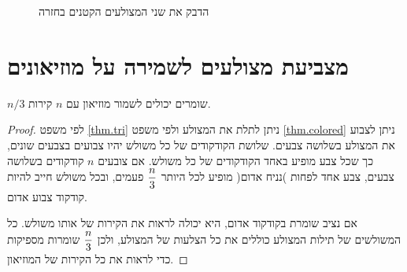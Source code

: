 \begin{figure}[htb]
\begin{center}
\end{center}
\caption{הדבק את שני המצולעים הקטנים בחזרה}\label{f.museum.three-5}
\end{figure}


\section{מצביעת מצולעים לשמירה על מוזיאונים}\label{s.museum-guard}

\begin{theorem}
$n/3$
שומרים יכולים לשמור מוזיאון עם 
$n$
קירות.
\end{theorem}


\begin{proof}
לפי משפט
\ref{thm.tri}
ניתן לתלת את המצולע ולפי משפט
\ref{thm.colored}
ניתן לצבוע את המצולע בשלושה צבעים. שלושת הקודקודים של כל משולש יהיו צבועים בצבעים שונים, כך שכל צבע מופיע באחד הקודקודים של כל משולש. אם צובעים 
$n$
קודקודים בשלושה צבעים, צבע אחד לפחות )נניח אדום( מופיע לכל היותר
$\displaystyle\frac{n}{3}$
פעמים, ובכל משולש חייב להיות קודקוד צבוע אדום.

אם נציב שומרת בקודקוד אדום, היא יכולה לראות את הקירות של אותו משולש. כל המשולשים של תילות המצולע כוללים את כל הצלעות של המצולע, ולכן
$\displaystyle\frac{n}{3}$
שומרות מספיקות כדי לראות את כל הקירות של המוזיאון.
\end{proof}

